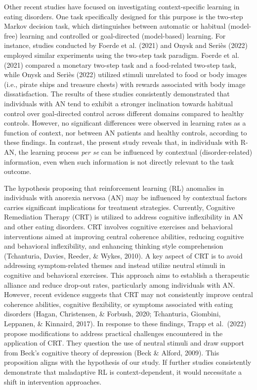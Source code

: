 \documentclass[
  man,floatsintext]{apa6}
\begin{document}
Other recent studies have focused on investigating context-specific learning in eating disorders. One task specifically designed for this purpose is the two-step Markov decision task, which distinguishes between automatic or habitual (model-free) learning and controlled or goal-directed (model-based) learning. For instance, studies conducted by Foerde et al. (2021) and Onysk and Seriès (2022) employed similar experiments using the two-step task paradigm. Foerde et al. (2021) compared a monetary two-step task and a food-related two-step task, while Onysk and Seriès (2022) utilized stimuli unrelated to food or body images (i.e., pirate ships and treasure chests) with rewards associated with body image dissatisfaction. The results of these studies consistently demonstrated that individuals with AN tend to exhibit a stronger inclination towards habitual control over goal-directed control across different domains compared to healthy controls. However, no significant differences were observed in learning rates as a function of context, nor between AN patients and healthy controls, according to these findings. In contrast, the present study reveals that, in individuals with R-AN, the learning process \emph{per se} can be influenced by contextual (disorder-related) information, even when such information is not directly relevant to the task outcome.

The hypothesis proposing that reinforcement learning (RL) anomalies in individuals with anorexia nervosa (AN) may be influenced by contextual factors carries significant implications for treatment strategies. Currently, Cognitive Remediation Therapy (CRT) is utilized to address cognitive inflexibility in AN and other eating disorders. CRT involves cognitive exercises and behavioral interventions aimed at improving central coherence abilities, reducing cognitive and behavioral inflexibility, and enhancing thinking style comprehension (Tchanturia, Davies, Reeder, \& Wykes, 2010). A key aspect of CRT is to avoid addressing symptom-related themes and instead utilize neutral stimuli in cognitive and behavioral exercises. This approach aims to establish a therapeutic alliance and reduce drop-out rates, particularly among individuals with AN. However, recent evidence suggests that CRT may not consistently improve central coherence abilities, cognitive flexibility, or symptoms associated with eating disorders (Hagan, Christensen, \& Forbush, 2020; Tchanturia, Giombini, Leppanen, \& Kinnaird, 2017). In response to these findings, Trapp et al.~(2022) propose modifications to address practical challenges encountered in the application of CRT. They question the use of neutral stimuli and draw support from Beck's cognitive theory of depression (Beck \& Alford, 2009). This proposition aligns with the hypothesis of our study. If further studies consistently demonstrate that maladaptive RL is context-dependent, it would necessitate a shift in intervention approaches.
\end{document}
